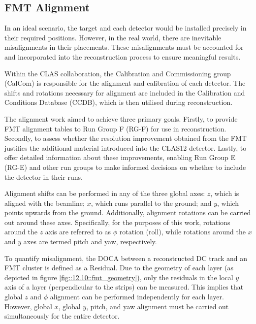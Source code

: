 \subsection{FMT Alignment}
\label{12.20::fmt_alignment}
    In an ideal scenario, the target and each detector would be installed precisely in their required positions.
    However, in the real world, there are inevitable misalignments in their placements.
    These misalignments must be accounted for and incorporated into the reconstruction process to ensure meaningful results.

    Within the CLAS collaboration, the Calibration and Commissioning group (CalCom) is responsible for the alignment and calibration of each detector.
    The shifts and rotations necessary for alignment are included in the Calibration and Conditions Database (CCDB), which is then utilised during reconstruction.

    The alignment work aimed to achieve three primary goals.
    Firstly, to provide FMT alignment tables to Run Group F (RG-F) for use in reconstruction.
    Secondly, to assess whether the resolution improvement obtained from the FMT justifies the additional material introduced into the CLAS12 detector.
    Lastly, to offer detailed information about these improvements, enabling Run Group E (RG-E) and other run groups to make informed decisions on whether to include the detector in their runs.

    Alignment shifts can be performed in any of the three global axes: $z$, which is aligned with the beamline; $x$, which runs parallel to the ground; and $y$, which points upwards from the ground.
    Additionally, alignment rotations can be carried out around these axes.
    Specifically, for the purposes of this work, rotations around the $z$ axis are referred to as $\phi$ rotation (roll), while rotations around the $x$ and $y$ axes are termed pitch and yaw, respectively.

    To quantify misalignment, the DOCA between a reconstructed DC track and an FMT cluster is defined as a Residual.
    Due to the geometry of each layer (as depicted in figure \ref{fig::12.10::fmt_geometry}), only the residuals in the local $y$ axis of a layer (perpendicular to the strips) can be measured.
    This implies that global $z$ and $\phi$ alignment can be performed independently for each layer.
    However, global $x$, global $y$, pitch, and yaw alignment must be carried out simultaneously for the entire detector.

